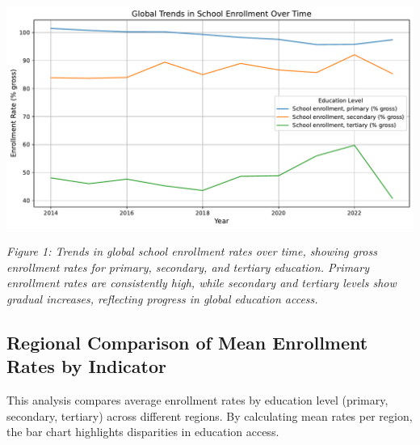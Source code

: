 \documentclass[
  letterpaper,
  DIV=11,
  numbers=noendperiod]{scrartcl}
\begin{document}
\includegraphics{report_files/figure-pdf/cell-3-output-1.pdf}

\emph{Figure 1: Trends in global school enrollment rates over time,
showing gross enrollment rates for primary, secondary, and tertiary
education. Primary enrollment rates are consistently high, while
secondary and tertiary levels show gradual increases, reflecting
progress in global education access.}

\subsection{Regional Comparison of Mean Enrollment Rates by
Indicator}\label{regional-comparison-of-mean-enrollment-rates-by-indicator}

This analysis compares average enrollment rates by education level
(primary, secondary, tertiary) across different regions. By calculating
mean rates per region, the bar chart highlights disparities in education
access.
\end{document}
